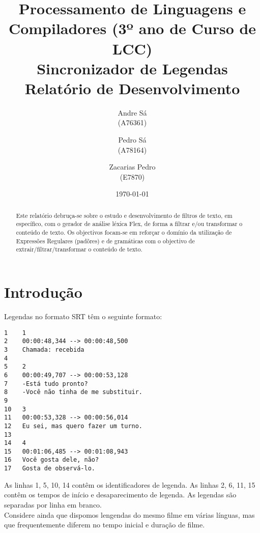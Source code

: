 \documentclass{report}
\title{Processamento de Linguagens e Compiladores (3º ano de Curso de LCC)\\ \textbf{Sincronizador de Legendas}\\ Relatório de Desenvolvimento}
\author{Andre Sá\\ (A76361) \and Pedro Sá\\ (A78164) \and Zacarias Pedro\\ (E7870) }
\date{\today}
\begin{document}
\maketitle

\begin{abstract}
Este relatório debruça-se sobre o estudo e desenvolvimento de filtros de texto, em específico, com o gerador de análise léxica Flex, de forma a filtrar e/ou transformar o conteúdo de texto.
Os objectivos focam-se em reforçar o domínio da utilização de Expressões Regulares (padõres) e de gramáticas com o objectivo de extrair/filtrar/transformar o conteúdo de texto.
\end{abstract}

\tableofcontents

\chapter{Introdução} \label{intro}
Legendas no formato SRT têm o seguinte formato:

\begin{verbatim}
1    1
2    00:00:48,344 --> 00:00:48,500
3    Chamada: recebida
4
5    2
6    00:00:49,707 --> 00:00:53,128
7    -Está tudo pronto?
8    -Você não tinha de me substituir.
9
10   3
11   00:00:53,328 --> 00:00:56,014
12   Eu sei, mas quero fazer um turno.
13
14   4
15   00:01:06,485 --> 00:01:08,943
16   Você gosta dele, não?
17   Gosta de observá-lo.
\end{verbatim}

As linhas 1, 5, 10, 14 contêm os identificadores de legenda. As linhas 2, 6, 11, 15 contêm os tempos de início e desaparecimento de legenda. As legendas são separadas por linha em branco.\\
Considere ainda que dispomos lengendas do mesmo filme em várias línguas, mas que frequentemente diferem no tempo inicial e duração de filme.
\end{document}
